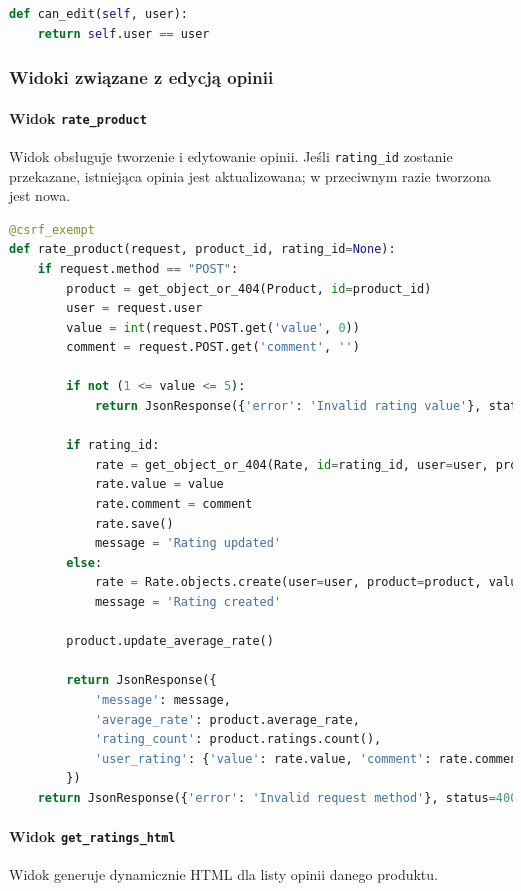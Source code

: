 \documentclass[12pt,a4paper,oneside]{article}
\theoremstyle{definition}
\numberwithin{equation}{section}
\begin{document}
\begin{lstlisting}[language=Python, caption=Metoda \texttt{can\_edit}]
def can_edit(self, user):
    return self.user == user
\end{lstlisting}



\subsubsection{Widoki związane z edycją opinii}

\paragraph{Widok \texttt{rate\_product}}
Widok obsługuje tworzenie i edytowanie opinii. Jeśli \texttt{rating\_id} zostanie przekazane, istniejąca opinia jest aktualizowana; w przeciwnym razie tworzona jest nowa.

\begin{lstlisting}[language=Python, caption=Widok \texttt{rate\_product}, label=rate_product_view]
@csrf_exempt
def rate_product(request, product_id, rating_id=None):
    if request.method == "POST":
        product = get_object_or_404(Product, id=product_id)
        user = request.user
        value = int(request.POST.get('value', 0))
        comment = request.POST.get('comment', '')

        if not (1 <= value <= 5):
            return JsonResponse({'error': 'Invalid rating value'}, status=400)

        if rating_id:
            rate = get_object_or_404(Rate, id=rating_id, user=user, product=product)
            rate.value = value
            rate.comment = comment
            rate.save()
            message = 'Rating updated'
        else:
            rate = Rate.objects.create(user=user, product=product, value=value, comment=comment)
            message = 'Rating created'

        product.update_average_rate()

        return JsonResponse({
            'message': message,
            'average_rate': product.average_rate,
            'rating_count': product.ratings.count(),
            'user_rating': {'value': rate.value, 'comment': rate.comment}
        })
    return JsonResponse({'error': 'Invalid request method'}, status=400)
\end{lstlisting}



\paragraph{Widok \texttt{get\_ratings\_html}}
Widok generuje dynamicznie HTML dla listy opinii danego produktu.
\end{document}
